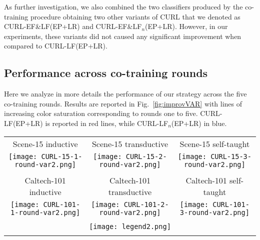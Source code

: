 \documentclass[journal,11pt]{IEEEtran}
\newcommand{\ADD}[1]{#1}
\newcommand{\coso}{strategy}
\newcommand{\curllf}{CURL-LF(EP+LR)}
\newcommand{\curllfn}{CURL-LF$_n$(EP+LR)}
\newcommand{\curleflf}{CURL-EF\&LF(EP+LR)}
\newcommand{\curleflfn}{CURL-EF\&LF$_n$(EP+LR)}
\begin{document}
As further investigation, we also combined the two classifiers produced by the co-training procedure obtaining two other variants of CURL that we denoted as \curleflf{ }and \curleflfn.
However, in our experiments, these variants did not caused any significant
improvement when compared to \curllf.



\subsection{Performance across co-training rounds}
\label{subsec:rounds}
Here we analyze \ADD{in more details} the performance of our \coso{ }across the five
co-training rounds. Results are reported in Fig.~\ref{fig:improvVAR} with lines of increasing color saturation corresponding to rounds one to five. \curllf{ }is reported in red lines, while \curllfn{ }in blue.
%
\begin{figure*}[!htbp]%
\centering
\renewcommand{\tabcolsep}{0cm}
\scriptsize
\begin{tabular}{ccc}
Scene-15 inductive & Scene-15 transductive & Scene-15 self-taught\\
\texttt{[image: CURL-15-1-round-var2.png]} &
\texttt{[image: CURL-15-2-round-var2.png]} &
\texttt{[image: CURL-15-3-round-var2.png]} \\
\\
Caltech-101 inductive & Caltech-101 transductive & Caltech-101 self-taught\\
\texttt{[image: CURL-101-1-round-var2.png]} &
\texttt{[image: CURL-101-2-round-var2.png]} &
\texttt{[image: CURL-101-3-round-var2.png]} \\
\\
\multicolumn{3}{c}{\texttt{[image: legend2.png]}} \\
\\
\end{tabular}
\caption{Performance obtained by \curllf{ }and \curllfn{ }varying the
  number of co-training rounds.  %
  Performance are reported in terms of MAP improvement
  with respect to Ensemble Projection.  Due to the small cardinality
  of some classes, inductive learning on the Caltech-101 has been
  limited to five labeled images per class.}
\label{fig:improvVAR}
\end{figure*}
\end{document}
